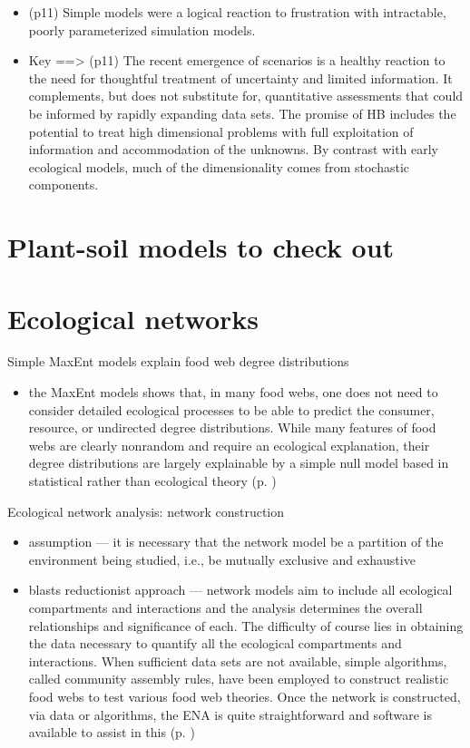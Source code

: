 \documentclass[twoside]{article}	                         %
\begin{document}
\begin{itemize}
  \item (p11) Simple models were a logical reaction to frustration with intractable, poorly parameterized simulation models.
  \item Key ==> (p11) The recent emergence of scenarios is a healthy reaction to the need for thoughtful treatment of uncertainty and limited information. It complements, but does not substitute for, quantitative assessments that could be informed by rapidly expanding data sets. The promise of HB includes the potential to treat high dimensional problems with full exploitation of information and accommodation of the unknowns. By contrast with early ecological models, much of the dimensionality comes from stochastic components.
\end{itemize}


\section{Plant-soil models to check out}
\citep{bever_incorporating_1997}


\section{Ecological networks}

\citep{williams_simple_2010} Simple MaxEnt models explain food web degree distributions
\begin{itemize}
  \item the MaxEnt models shows that, in many food webs, one does not need to consider detailed ecological processes to be able to predict the consumer, resource, or undirected degree distributions. While many features of food webs are clearly nonrandom and require an ecological explanation, their degree distributions are largely explainable by a simple null model based in statistical rather than ecological theory (p. )
\end{itemize}


\citep{fath_ecological_2007} Ecological network analysis: network construction
\begin{itemize}
  \item assumption --- it is necessary that the network model be a partition of the environment being studied, i.e., be mutually exclusive and exhaustive
  \item blasts reductionist approach ---  network models aim to include all ecological compartments and interactions and the analysis determines the overall relationships and significance of each. The difficulty of course lies in obtaining the data necessary to quantify all the ecological compartments and interactions. When sufficient data sets are not available, simple algorithms, called community assembly rules, have been employed to construct realistic food webs to test various food web theories. Once the network is constructed, via data or algorithms, the ENA is quite straightforward and software is available to assist in this (p.  )
\end{itemize}
\end{document}
